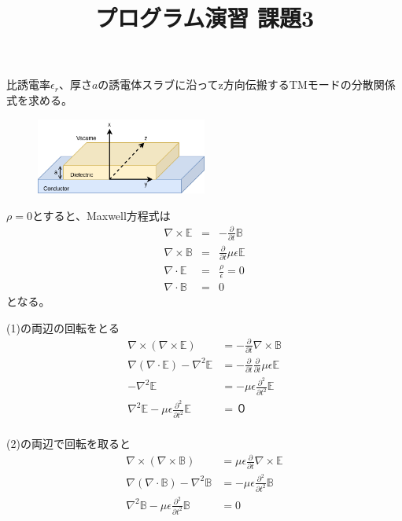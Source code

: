 \documentclass[a4paper,10pt]{bxjsarticle}
\title{プログラム演習 課題3}
\date{ }
\begin{document}
\maketitle


比誘電率$\epsilon_r$、厚さ$a$の誘電体スラブに沿ってz方向伝搬するTMモードの分散関係式を求める。

\begin{figure}[h]
    \centering
    \includegraphics[width=0.5\textwidth]{fig.png}
    \caption{}
    \label{fig:1}
\end{figure}

$\rho = 0$とすると、Maxwell方程式は
\begin{eqnarray}
    \nabla \times \mathbb{E} &=& - \frac{\partial}{\partial t} \mathbb{B} \\
    \nabla \times \mathbb{B} &=&  \frac{\partial}{\partial t} \mu \epsilon \mathbb{E} \\
    \nabla \cdot \mathbb{E} &=& \frac{\rho}{\epsilon} = 0 \\
    \nabla \cdot \mathbb{B} &=& 0
\end{eqnarray}
となる。

(1)の両辺の回転をとる
\begin{align*}
    \nabla \times \left(\nabla \times \mathbb{E}\right)
        &= - \frac{\partial}{\partial t} \nabla \times \mathbb{B} \\
    \nabla \left(\nabla \cdot \mathbb{E}\right) - \nabla^2 \mathbb{E}
        &= - \frac{\partial}{\partial t} \frac{\partial}{\partial t} \mu \epsilon \mathbb{E} \\
    - \nabla^2 \mathbb{E}
        &= - \mu \epsilon \frac{\partial^2}{\partial t^2} \mathbb{E} \\
    \nabla^2 \mathbb{E} - \mu \epsilon \frac{\partial^2}{\partial t^2} \mathbb{E}
        &= ０ \tag{5} \\
\end{align*}

(2)の両辺で回転を取ると
\begin{align*}
    \nabla \times \left(\nabla \times \mathbb{B}\right)
        &= \mu \epsilon \frac{\partial}{\partial t} \nabla \times \mathbb{E} \\
    \nabla(\nabla \cdot \mathbb{B}) - \nabla^2 \mathbb{B}
        &= - \mu \epsilon \frac{\partial^2}{\partial t^2} \mathbb{B} \\
    \nabla^2 \mathbb{B} - \mu \epsilon \frac{\partial^2}{\partial t^2} \mathbb{B} 
        &= 0 \tag{6} \\
\end{align*}
\end{document}

